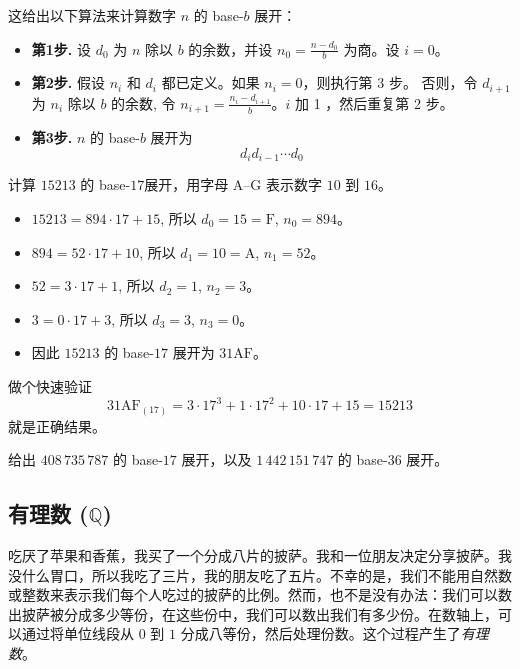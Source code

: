 这给出以下算法来计算数字 $n$ 的 base-$b$ 展开：
\begin{itemize}
\item \textbf{第1步. } 设 $d_0$ 为 $n$ 除以 $b$ 的余数，并设 $n_0=\frac{n-d_0}{b}$ 为商。设 $i=0$。
\item \textbf{第2步. } 假设 $n_i$ 和 $d_i$ 都已定义。如果 $n_i=0$，则执行第 3 步。 否则，令 $d_{i+1}$ 为 $n_i$ 除以 $b$ 的余数, 令 $n_{i+1} = \frac{n_i-d_{i+1}}{b}$。$i$ 加 1 ，然后重复第 2 步。
\item \textbf{第3步. } $n$ 的 base-$b$ 展开为
\[ d_id_{i-1} \cdots d_0 \]
\end{itemize}

\begin{example}
计算 $15213$ 的 base-$17$展开，用字母 $\mathrm{A}$--$\mathrm{G}$ 表示数字 $10$ 到 $16$。
\begin{itemize}
\item $15213 = 894 \cdot 17 + 15$, 所以 $d_0=15=\mathrm{F}$, $n_0=894$。
\item $894 = 52 \cdot 17 + 10$, 所以 $d_1=10 = \mathrm{A}$, $n_1=52$。
\item $52 = 3 \cdot 17 + 1$, 所以 $d_2 = 1$, $n_2=3$。
\item $3 = 0 \cdot 17 + 3$, 所以 $d_3 = 3$, $n_3=0$。
\item 因此 $15213$ 的 base-$17$ 展开为 $31\mathrm{AF}$。
\end{itemize}
做个快速验证
\[ 31\mathrm{AF}_{(17)} = 3 \cdot 17^3 + 1 \cdot 17^2 + 10 \cdot 17 + 15 = 15213 \]
就是正确结果。
\end{example}

\begin{exercise}
给出 $408\,735\,787$ 的 base-$17$ 展开，以及 $1\,442\,151\,747$ 的 base-$36$ 展开。
\end{exercise}

\subsection*{有理数 ($\mathbb{Q}$)}

吃厌了苹果和香蕉，我买了一个分成八片的披萨。我和一位朋友决定分享披萨。我没什么胃口，所以我吃了三片，我的朋友吃了五片。不幸的是，我们不能用自然数或整数来表示我们每个人吃过的披萨的比例。然而，也不是没有办法：我们可以数出披萨被分成多少等份，在这些份中，我们可以数出我们有多少份。在数轴上，可以通过将单位线段从 $0$ 到 $1$ 分成八等份，然后处理份数。这个过程产生了\textit{有理数}。

